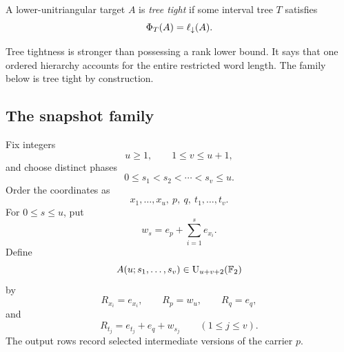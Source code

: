 \begin{definition}\label{g:def:tree-tight}
A lower-unitriangular target $A$ is \emph{tree tight} if some interval tree $T$ satisfies
\[
\Phi_T(A)=\ell_{\downarrow}(A).
\]
\end{definition}

Tree tightness is stronger than possessing a rank lower bound.  It says that one ordered hierarchy accounts for the entire restricted word length.  The family below is tree tight by construction.

\subsection{The snapshot family}

Fix integers
\[
u\ge1,
\qquad
1\le v\le u+1,
\]
and choose distinct phases
\[
0\le s_1<s_2<\cdots<s_v\le u.
\]
Order the coordinates as
\[
x_1,\ldots,x_u,\ p,\ q,\ t_1,\ldots,t_v.
\]
For $0\le s\le u$, put
\begin{equation}\label{g:eq:prefix-state}
w_s=e_p+\sum_{i=1}^{s}e_{x_i}.
\end{equation}
Define
\begin{equation}\label{g:eq:snapshot-target}
A(u;s_1,\ldots,s_v)\in\operatorname{U}_{u+v+2}(\mathbb F_2)
\end{equation}
by
\[
R_{x_i}=e_{x_i},
\qquad
R_p=w_u,
\qquad
R_q=e_q,
\]
and
\begin{equation}\label{g:eq:snapshot-output}
R_{t_j}=e_{t_j}+e_q+w_{s_j}
\qquad(1\le j\le v).
\end{equation}
The output rows record selected intermediate versions of the carrier $p$.

